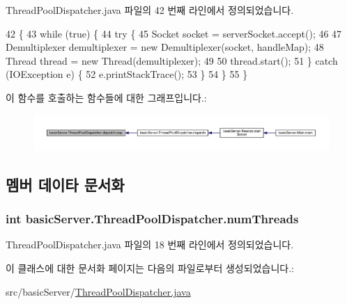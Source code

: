 Thread\+Pool\+Dispatcher.\+java 파일의 42 번째 라인에서 정의되었습니다.


\begin{DoxyCode}
42                                                                               \{
43         \textcolor{keywordflow}{while} (\textcolor{keyword}{true}) \{
44             \textcolor{keywordflow}{try} \{
45                 Socket socket = serverSocket.accept();
46 
47                 Demultiplexer demultiplexer = \textcolor{keyword}{new} Demultiplexer(socket, handleMap);
48                 Thread thread = \textcolor{keyword}{new} Thread(demultiplexer);
49 
50                 thread.start();
51             \} \textcolor{keywordflow}{catch} (IOException e) \{
52                 e.printStackTrace();
53             \}
54         \}
55     \}
\end{DoxyCode}


이 함수를 호출하는 함수들에 대한 그래프입니다.\+:\nopagebreak
\begin{figure}[H]
\begin{center}
\leavevmode
\includegraphics[width=350pt]{classbasic_server_1_1_thread_pool_dispatcher_a80411d17546dd5ff40af166ef50e2e32_icgraph}
\end{center}
\end{figure}




\subsection{멤버 데이타 문서화}
\hypertarget{classbasic_server_1_1_thread_pool_dispatcher_a0c78b67cc799e2aa23038d96e9bf9af8}{
\subsubsection[{num\+Threads}]{\setlength{\rightskip}{0pt plus 5cm}int basic\+Server.\+Thread\+Pool\+Dispatcher.\+num\+Threads\hspace{0.3cm}{\ttfamily [private]}}}\label{classbasic_server_1_1_thread_pool_dispatcher_a0c78b67cc799e2aa23038d96e9bf9af8}


Thread\+Pool\+Dispatcher.\+java 파일의 18 번째 라인에서 정의되었습니다.



이 클래스에 대한 문서화 페이지는 다음의 파일로부터 생성되었습니다.\+:\begin{DoxyCompactItemize}
\item 
src/basic\+Server/\hyperlink{_thread_pool_dispatcher_8java}{Thread\+Pool\+Dispatcher.\+java}\end{DoxyCompactItemize}
